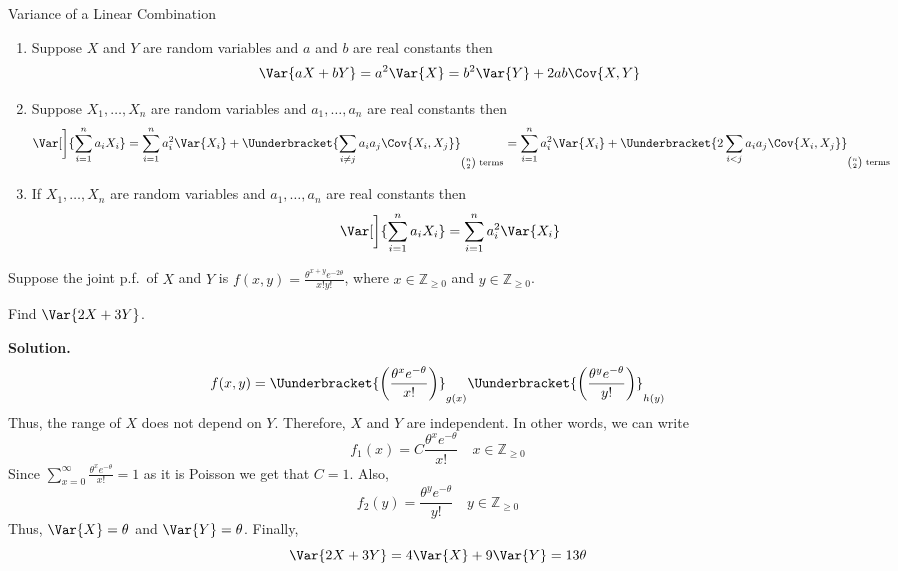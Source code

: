 \begin{Theorem}{Variance of a Linear Combination}{}
    \begin{enumerate}[label=(\arabic*)]
        \item Suppose $ X $ and $ Y $ are random variables
              and $ a $ and $ b $ are real constants then
              \[ \Var{aX+bY}=a^2\Var{X}=b^2\Var{Y}+2ab\Cov{X,Y} \]
        \item Suppose $ X_1,\ldots,X_n $ are random variables
              and $ a_1,\ldots,a_n $ are real constants then
              \[ \Var[\bigg]{\sum_{i=1}^{n} a_i X_i}=
                  \sum_{i=1}^{n} a_i^2 \Var{X_i}+\Uunderbracket{\sum_{i\neq j}a_i a_j\Cov{X_i,X_j}}_{\binom{n}{2}\text{ terms}}=
                  \sum_{i=1}^{n} a_i^2\Var{X_i}
                  +\Uunderbracket{2\sum_{i<j}a_i a_j\Cov{X_i,X_j}}_{\binom{n}{2}\text{ terms}} \]
        \item If $ X_1,\ldots,X_n $ are random variables
              and $ a_1,\ldots,a_n $ are real constants then
              \[ \Var[\bigg]{\sum_{i=1}^{n} a_i X_i}=\sum_{i=1}^{n} a_i^2\Var{X_i} \]
    \end{enumerate}
\end{Theorem}
\begin{Example}{}{}
    Suppose the joint p.f.\ of $ X $ and $ Y $ is
    $ \displaystyle f(x,y)=\frac{\theta^{x+y}e^{-2\theta}}{x!y!} $,
    where $ x\in\mathbb{Z}_{\geqslant 0} $ and $ y\in\mathbb{Z}_{\geqslant 0} $.

    Find $ \Var{2X+3Y} $.

    \textbf{Solution.}
    \[ f(x,y)=\Uunderbracket{\left( \frac{\theta^x e^{-\theta}}{x!} \right)}_{g(x)}
        \Uunderbracket{\left( \frac{\theta^y e^{-\theta}}{y!} \right)}_{h(y)} \]
    Thus, the range of $ X $ does not depend on $ Y $. Therefore,
    $ X $ and $ Y $ are independent. In other words, we can write
    \[ f_1(x)=C \frac{\theta^x e^{-\theta}}{x!} \quad x\in\mathbb{Z}_{\geqslant 0}\]
    Since $ \displaystyle \sum_{x=0}^{\infty} \frac{\theta^x e^{-\theta}}{x!} =1 $
    as it is Poisson we get that $ C=1 $. Also,
    \[ f_2(y)=\frac{\theta^y e^{-\theta}}{y!}\quad y\in\mathbb{Z}_{\geqslant 0} \]
    Thus, $ \Var{X}=\theta $ and $ \Var{Y}=\theta $. Finally,
    \[ \Var{2X+3Y}=4\Var{X}+9\Var{Y}=13\theta \]
\end{Example}
